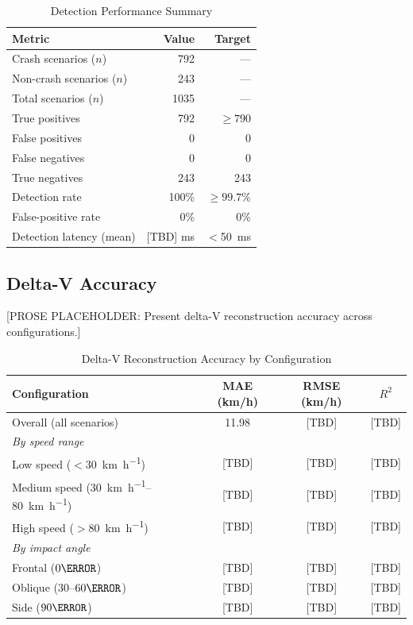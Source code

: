 \documentclass[conference,twocolumn]{IEEEtran}
\begin{document}
\begin{table}[t]
\centering
\caption{Detection Performance Summary}
\label{tab:detection-results}
\small
\renewcommand{\arraystretch}{1.15}
\begin{tabular}{@{}l r r@{}}
\toprule
\textbf{Metric} & \textbf{Value} & \textbf{Target} \\
\midrule
Crash scenarios ($n$)       & 792           & --- \\
Non-crash scenarios ($n$)   & 243           & --- \\
Total scenarios ($n$)       & 1035          & --- \\
True positives              & 792           & $\geq 790$ \\
False positives             & 0             & 0 \\
False negatives             & 0             & 0 \\
True negatives              & 243           & 243 \\
Detection rate              & 100\%         & $\geq 99.7\%$ \\
False-positive rate         & 0\%           & 0\% \\
Detection latency (mean)    & [TBD] ms      & $<$\SI{50}{\milli\second} \\
\bottomrule
\end{tabular}
\end{table}

\subsection{Delta-V Accuracy}

[PROSE PLACEHOLDER: Present delta-V reconstruction accuracy across configurations.]

\begin{table}[t]
\centering
\caption{Delta-V Reconstruction Accuracy by Configuration}
\label{tab:deltav-accuracy}
\small
\renewcommand{\arraystretch}{1.15}
\begin{tabular}{@{}l c c c@{}}
\toprule
\textbf{Configuration} & \textbf{MAE (km/h)} & \textbf{RMSE (km/h)} & \textbf{$R^2$} \\
\midrule
Overall (all scenarios)          & 11.98 & [TBD] & [TBD] \\
\midrule
\multicolumn{4}{l}{\textit{By speed range}} \\
\midrule
Low speed ($<$\SI{30}{\kilo\meter\per\hour}) & [TBD] & [TBD] & [TBD] \\
Medium speed (\SIrange{30}{80}{\kilo\meter\per\hour}) & [TBD] & [TBD] & [TBD] \\
High speed ($>$\SI{80}{\kilo\meter\per\hour}) & [TBD] & [TBD] & [TBD] \\
\midrule
\multicolumn{4}{l}{\textit{By impact angle}} \\
\midrule
Frontal ($0\degree$) & [TBD] & [TBD] & [TBD] \\
Oblique ($30$--$60\degree$) & [TBD] & [TBD] & [TBD] \\
Side ($90\degree$) & [TBD] & [TBD] & [TBD] \\
\bottomrule
\end{tabular}
\end{table}
\end{document}
